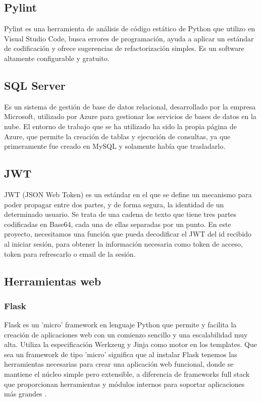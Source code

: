 \subsection{Pylint}
Pylint es una herramienta de análisis de código estático de Python que utilizo en Visual Studio Code, busca errores de programación, ayuda a aplicar un estándar de codificación y ofrece sugerencias de refactorización simples. Es un software altamente configurable y gratuito.\cite{pylint}

\subsection{SQL Server}
Es un sistema de gestión de base de datos relacional, desarrollado por la empresa Microsoft, utilizado por Azure para gestionar los servicios de bases de datos en la nube. El entorno de trabajo que se ha utilizado ha sido la propia página de Azure, que permite la creación de tablas y ejecución de consultas, ya que primeramente fue creado en MySQL y solamente había que trasladarlo.\cite{wiki:sqlServer}

\subsection{JWT} 
JWT (JSON Web Token) es un estándar en el que se define un mecanismo para poder propagar entre dos partes, y de forma segura, la identidad de un determinado usuario. Se trata de una cadena de texto que tiene tres partes codificadas en Base64, cada una de ellas separadas por un punto. En este proyecto, necesitamos una función que pueda decodificar el JWT del id recibido al iniciar sesión, para obtener la información necesaria como token de acceso, token para refrescarlo o email de la sesión.\cite{JWT}

\subsection{Herramientas web}

\subsubsection{Flask}
Flask es un 'micro' framework en lenguaje Python que permite y facilita la creación de aplicaciones web con un comienzo sencillo y una escalabilidad muy alta. Utiliza la especificación Werkzeug y Jinja\cite{wiki:jinja2} como motor en los templates.\newline
Que sea un framework de tipo 'micro' significa que al instalar Flask tenemos las herramientas necesarias para crear una aplicación web funcional, donde se mantiene el núcleo simple pero extensible, a diferencia de frameworks full stack que proporcionan herramientas y módulos internos para soportar aplicaciones más grandes \cite{FlaskDefinicion}.

